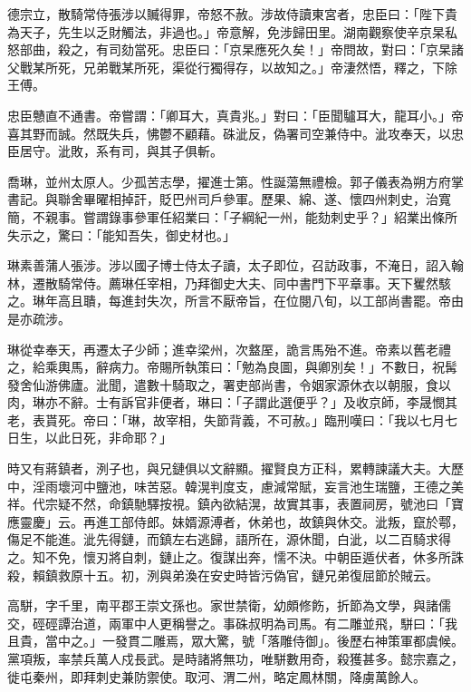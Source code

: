 \begin{pinyinscope}
 德宗立，散騎常侍張涉以贓得罪，帝怒不赦。涉故侍讀東宮者，忠臣曰：「陛下貴為天子，先生以乏財觸法，非過也。」帝意解，免涉歸田里。湖南觀察使辛京杲私怒部曲，殺之，有司劾當死。忠臣曰：「京杲應死久矣！」帝問故，對曰：「京杲諸父戰某所死，兄弟戰某所死，渠從行獨得存，以故知之。」帝淒然悟，釋之，下除王傅。



 忠臣戇直不通書。帝嘗謂：「卿耳大，真貴兆。」對曰：「臣聞驢耳大，龍耳小。」帝喜其野而誠。然既失兵，怫鬱不顧藉。硃泚反，偽署司空兼侍中。泚攻奉天，以忠臣居守。泚敗，系有司，與其子俱斬。



 喬琳，並州太原人。少孤苦志學，擢進士第。性誕蕩無禮檢。郭子儀表為朔方府掌書記。與聯舍畢曜相掉訐，貶巴州司戶參軍。歷果、綿、遂、懷四州刺史，治寬簡，不親事。嘗謂錄事參軍任紹業曰：「子綱紀一州，能劾刺史乎？」紹業出條所失示之，驚曰：「能知吾失，御史材也。」



 琳素善蒲人張涉。涉以國子博士侍太子讀，太子即位，召訪政事，不淹日，詔入翰林，遷散騎常侍。薦琳任宰相，乃拜御史大夫、同中書門下平章事。天下矍然駭之。琳年高且聵，每進封失次，所言不厭帝旨，在位閱八旬，以工部尚書罷。帝由是亦疏涉。



 琳從幸奉天，再遷太子少師；進幸梁州，次盩厔，詭言馬殆不進。帝素以舊老禮之，給乘輿馬，辭病力。帝賜所執策曰：「勉為良圖，與卿別矣！」不數日，祝髯發舍仙游佛廬。泚聞，遣數十騎取之，署吏部尚書，令姻家源休衣以朝服，食以肉，琳亦不辭。士有訴官非便者，琳曰：「子謂此選便乎？」及收京師，李晟憫其老，表貰死。帝曰：「琳，故宰相，失節背義，不可赦。」臨刑嘆曰：「我以七月七日生，以此日死，非命耶？」



 時又有蔣鎮者，洌子也，與兄鏈俱以文辭顯。擢賢良方正科，累轉諫議大夫。大歷中，淫雨壞河中鹽池，味苦惡。韓滉判度支，慮減常賦，妄言池生瑞鹽，王德之美祥。代宗疑不然，命鎮馳驛按視。鎮內欲結滉，故實其事，表置祠房，號池曰「寶應靈慶」云。再進工部侍郎。妹婿源溥者，休弟也，故鎮與休交。泚叛，竄於鄠，傷足不能進。泚先得鏈，而鎮左右逃歸，語所在，源休聞，白泚，以二百騎求得之。知不免，懷刃將自刺，鏈止之。復謀出奔，懦不決。中朝臣遁伏者，休多所誅殺，賴鎮救原十五。初，洌與弟渙在安史時皆污偽官，鏈兄弟復屈節於賊云。



 高駢，字千里，南平郡王崇文孫也。家世禁衛，幼頗修飭，折節為文學，與諸儒交，硜硜譚治道，兩軍中人更稱譽之。事硃叔明為司馬。有二雕並飛，駢曰：「我且貴，當中之。」一發貫二雕焉，眾大驚，號「落雕侍御」。後歷右神策軍都虞候。黨項叛，率禁兵萬人戍長武。是時諸將無功，唯駢數用奇，殺獲甚多。懿宗嘉之，徙屯秦州，即拜刺史兼防禦使。取河、渭二州，略定鳳林關，降虜萬餘人。




\end{pinyinscope}
